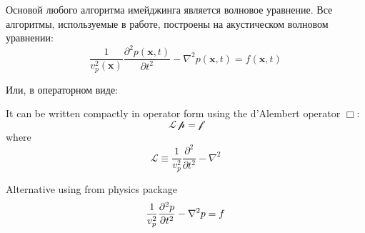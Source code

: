 \documentclass{article}
\begin{document}
Основой любого алгоритма имейджинга является волновое уравнение. Все алгоритмы, используемые в работе, построены на акустическом волновом уравнении:
\[
\frac{1}{v_p^2(\mathbf{x})} \frac{\partial^2 p(\mathbf{x}, t)}{\partial t^2} - \nabla^2 p(\mathbf{x}, t) = f(\mathbf{x}, t)
\]

Или, в операторном виде: 

It can be written compactly in operator form using the d'Alembert operator $\Box$:
\[
\mathcal{L} \, \mathcal{p} = \mathcal{f}
\]
where
\[
\mathcal{L} \equiv \frac{1}{v_p^2} \frac{\partial^2}{\partial t^2} - \nabla^2
\]

Alternative using \laplacian from physics package
\[
\frac{1}{v_p^2} \frac{\partial^2 p}{\partial t^2} - \laplacian{p} = f
\]
\end{document}
